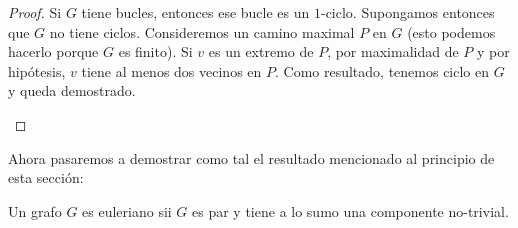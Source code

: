 \begin{proof}
    Si $G$ tiene bucles, entonces ese bucle es un $1$-ciclo. Supongamos entonces que $G$ no tiene ciclos. Consideremos un camino maximal $P$ en $G$ (esto podemos hacerlo porque $G$ es finito). Si $v$ es un extremo de $P$, por maximalidad de $P$ y por hipótesis, $v$ tiene al menos dos vecinos en $P$. Como resultado, tenemos ciclo en $G$ y queda demostrado.
    
    \begin{figure}
        \centering
    \end{figure}
\end{proof}

Ahora pasaremos a demostrar como tal el resultado mencionado al principio de esta sección:

\begin{teo}\label{teo:suf-euler}
    Un grafo $G$ es euleriano sii $G$ es par y tiene a lo sumo una componente no-trivial.
\end{teo}

